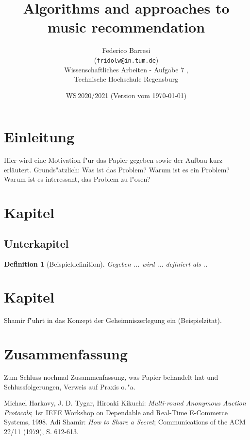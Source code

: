 \documentclass[11pt,twoside,a4paper]{article}
\newtheorem{defi}{Definition}
\begin{document}
\title{Algorithms and approaches to music recommendation}
\author{Federico Barresi \\
  (\texttt{fridolw@in.tum.de})\\[5mm]
  Wissenschaftliches Arbeiten - Aufgabe 7 , \\
  Technische Hochschule Regensburg
}
  
\date{WS\,2020/2021 (Version vom \today)}

\maketitle


\section{Einleitung}
Hier wird eine Motivation f"ur das Papier gegeben sowie der Aufbau kurz 
erl\"autert.  Grunds"atzlich:  Was ist das Problem?  Warum ist es ein
Problem?  Warum ist es interessant, das Problem zu l"osen?

\section{Kapitel}

\subsection{Unterkapitel}

\begin{defi}[Beispieldefinition]
Gegeben ... wird ... definiert als ..
\end{defi}

\section{Kapitel}

Shamir f"uhrt in \cite{sham79} das Konzept der Geheimniszerlegung ein 
(Beispielzitat).

\section{Zusammenfassung}
Zum Schluss nochmal Zusammenfassung, was Papier behandelt hat und 
Schlussfolgerungen, Verweis auf Praxis o.\,"a.


\begin{thebibliography}{12}

        Michael Harkavy, J. D. Tygar, Hiroaki Kikuchi: {\sl Multi-round 
        Anonymous Auction Protocols}; 1st IEEE Workshop on Dependable and 
        Real-Time E-Commerce Systems, 1998.
        Adi Shamir: {\sl How to Share a Secret}; 
        Communications of the ACM 22/11 (1979), S. 612-613.
\end{thebibliography}
\end{document}
